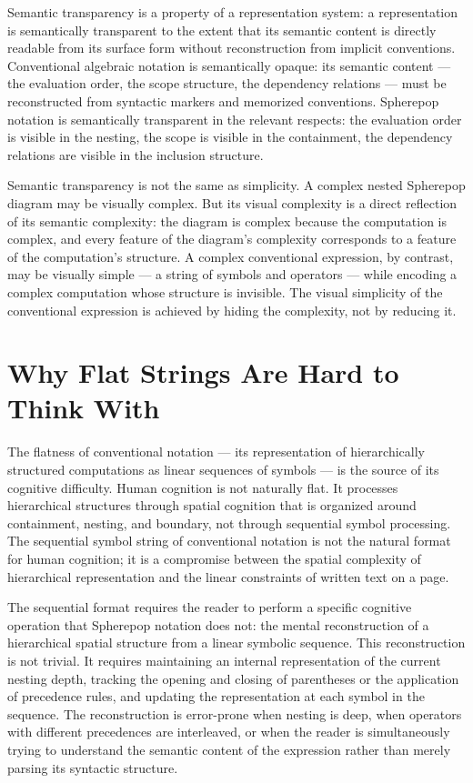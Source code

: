 \documentclass[12pt,openany]{book}
\theoremstyle{plain}
\theoremstyle{definition}
\theoremstyle{remark}
\begin{document}
Semantic transparency is a property of a representation system: a representation is semantically transparent to the extent that its semantic content is directly readable from its surface form without reconstruction from implicit conventions. Conventional algebraic notation is semantically opaque: its semantic content — the evaluation order, the scope structure, the dependency relations — must be reconstructed from syntactic markers and memorized conventions. Spherepop notation is semantically transparent in the relevant respects: the evaluation order is visible in the nesting, the scope is visible in the containment, the dependency relations are visible in the inclusion structure.

Semantic transparency is not the same as simplicity. A complex nested Spherepop diagram may be visually complex. But its visual complexity is a direct reflection of its semantic complexity: the diagram is complex because the computation is complex, and every feature of the diagram's complexity corresponds to a feature of the computation's structure. A complex conventional expression, by contrast, may be visually simple — a string of symbols and operators — while encoding a complex computation whose structure is invisible. The visual simplicity of the conventional expression is achieved by hiding the complexity, not by reducing it.

\section{Why Flat Strings Are Hard to Think With}

The flatness of conventional notation — its representation of hierarchically structured computations as linear sequences of symbols — is the source of its cognitive difficulty. Human cognition is not naturally flat. It processes hierarchical structures through spatial cognition that is organized around containment, nesting, and boundary, not through sequential symbol processing. The sequential symbol string of conventional notation is not the natural format for human cognition; it is a compromise between the spatial complexity of hierarchical representation and the linear constraints of written text on a page.

The sequential format requires the reader to perform a specific cognitive operation that Spherepop notation does not: the mental reconstruction of a hierarchical spatial structure from a linear symbolic sequence. This reconstruction is not trivial. It requires maintaining an internal representation of the current nesting depth, tracking the opening and closing of parentheses or the application of precedence rules, and updating the representation at each symbol in the sequence. The reconstruction is error-prone when nesting is deep, when operators with different precedences are interleaved, or when the reader is simultaneously trying to understand the semantic content of the expression rather than merely parsing its syntactic structure.
\end{document}
